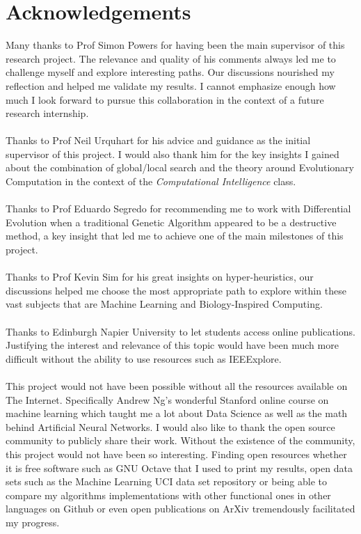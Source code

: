 \documentclass[a4paper,12pt, oneside]{memoir}
\begin{document}
\tableofcontents

\clearpage
\chapter{Acknowledgements}
Many thanks to Prof Simon Powers for having been the main supervisor of this research project. The relevance and quality of his comments always led me to challenge myself and explore interesting paths. Our discussions nourished my reflection and helped me validate my results. I cannot emphasize enough how much I look forward to pursue this collaboration in the context of a future research internship.
\\ \\
Thanks to Prof Neil Urquhart for his advice and guidance as the initial supervisor of this project. I would also thank him for the key insights I gained about the combination of global/local search and the theory around Evolutionary Computation in the context of the \textit{Computational Intelligence} class.
\\ \\
Thanks to Prof Eduardo Segredo for recommending me to work with Differential Evolution when a traditional Genetic Algorithm appeared to be a destructive method, a key insight that led me to achieve one of the main milestones of this project.
\\ \\
Thanks to Prof Kevin Sim for his great insights on hyper-heuristics, our discussions helped me choose the most appropriate path to explore within these vast subjects that are Machine Learning and Biology-Inspired Computing.
\\ \\
Thanks to Edinburgh Napier University to let students access online publications. Justifying the interest and relevance of this topic would have been much more difficult without the ability to use resources such as IEEExplore.
\\ \\
This project would not have been possible without all the resources available on The Internet. Specifically Andrew Ng's wonderful Stanford online course on machine learning which taught me a lot about Data Science as well as the math behind Artificial Neural Networks. I would also like to thank the open source community to publicly share their work. Without the existence of the community, this project would not have been so interesting. Finding open resources whether it is free software such as GNU Octave that I used to print my results, open data sets such as the Machine Learning UCI data set repository or being able to compare my algorithms implementations with other functional ones in other languages on Github or even open publications on ArXiv tremendously facilitated my progress.
\end{document}
